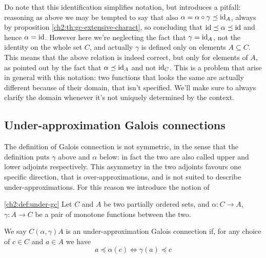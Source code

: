 Do note that this identification simplifies notation, but introduces a pitfall: reasoning as above we may be tempted to say that also $\alpha = \alpha \circ \gamma \preceq \text{id}_A$, always by proposition \ref{ch2:th:gc-extensive-charact}, so concluding that $\text{id} \preceq \alpha \preceq \text{id}$ and hence $\alpha = \text{id}$. However here we're neglecting the fact that $\gamma = \text{id}_A$, not the identity on the whole set $C$, and actually $\gamma$ is defined only on elements $A \subseteq C$. This means that the above relation is indeed correct, but only for elements of $A$, as pointed out by the fact that $\alpha \preceq \text{id}_A$ and not $\text{id}_C$. This is a problem that arise in general with this notation: two functions that looks the same are actually different because of their domain, that isn't specified. We'll make sure to always clarify the domain whenever it's not uniquely determined by the context.

\subsection{Under-approximation Galois connections}
%

The definition of Galois connection is not symmetric, in the sense that the definition puts $\gamma$ above and $\alpha$ below: in fact the two are also called upper and lower adjoints respectively. This asymmetry in the two adjoints favours one specific direction, that is over-approximations, and is not suited to describe under-approximations. For this reason we introduce the notion of
\begin{definition}\ref{ch2:def:under-gc}
	Let $C$ and $A$ be two partially ordered sets, and $\alpha : C \rightarrow A$, $\gamma : A \rightarrow C$ be a pair of monotone functions between the two.
	
	We say $C (\alpha, \gamma) A$ is an under-approximation Galois connection if, for any choice of $c \in C$ and $a \in A$ we have
	\[
	a \preceq \alpha(c) \iff \gamma(a) \preceq c
	\]
\end{definition}

